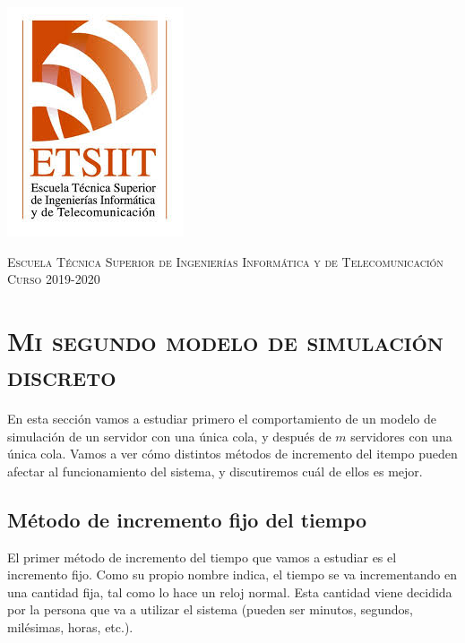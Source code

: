 \documentclass[11pt,a4paper]{article}
\begin{document}
\begin{titlepage}
\begin{minipage}{\textwidth}
\includegraphics[scale=0.3]{img/etsiit.jpeg}

\vspace{0.7cm}
\textsc{Escuela Técnica Superior de Ingenierías Informática y de Telecomunicación}\\
\vspace{1cm}
\textsc{Curso 2019-2020}
\end{minipage}
\end{titlepage}

\tableofcontents
\thispagestyle{empty}				%

\newpage

\setlength{\parskip}{1em}

\section{\textsc{Mi segundo modelo de simulación discreto}}

En esta sección vamos a estudiar primero el comportamiento de un modelo de
simulación de un servidor con una única cola, y después de $m$ servidores
con una única cola. Vamos a ver cómo distintos métodos de incremento del
itempo pueden afectar al funcionamiento del sistema, y discutiremos cuál
de ellos es mejor.

\subsection{Método de incremento fijo del tiempo}

El primer método de incremento del tiempo que vamos a estudiar es el incremento
fijo. Como su propio nombre indica, el tiempo se va incrementando en una cantidad
fija, tal como lo hace un reloj normal. Esta cantidad viene decidida por la persona
que va a utilizar el sistema (pueden ser minutos, segundos, milésimas, horas, etc.).
\end{document}
